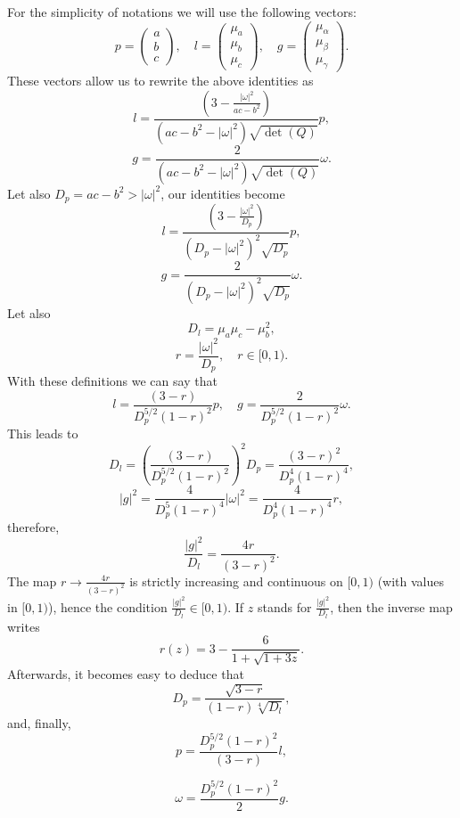 For the simplicity of notations we will use the following vectors:
\[
    p = \begin{pmatrix}
        a\\b\\c
    \end{pmatrix},
    \quad
    l = \begin{pmatrix}
        \mu_a\\\mu_b\\\mu_c
    \end{pmatrix},
    \quad 
    g = \begin{pmatrix}
        \mu_{\alpha}\\\mu_{\beta}\\\mu_{\gamma}
    \end{pmatrix}.
\]
These vectors allow us to rewrite the above identities as
\[
    l = \frac{  \left(3-\frac{|\omega|^2}{ac-b^2}\right)}
    {(ac-b^2-|\omega|^2)\sqrt {\det(Q)}}p,
\]
\[
    g =  \frac{2 }{(ac-b^2-|\omega|^2)\sqrt {\det(Q)}}\omega.
\]
Let also $D_p=ac-b^2>|\omega|^2$, our identities become
\[
    l = \frac{  \left(3-\frac{|\omega|^2}{D_p}\right)}{(D_p-|\omega|^2)^2\sqrt { D_p}}p,
\]
\[
    g =  \frac{2 }{(D_p-|\omega|^2)^2\sqrt { D_p}}\omega.
\]
Let also 
\[
    D_l = \mu_a \mu_c- \mu_b^2,
\]
\[
    r = \frac{|\omega|^2}{D_p},\quad  r\in[0,1) .
\]
With these definitions we can say that
\[
    l = \frac{ (3-r )}{D_p^{5/2}(1-r)^2}p,
    \quad g = \frac{2 }{D_p^{5/2}(1-r)^2}\omega.
\]
This leads to
\[
    D_l = \left( \frac{ (3-r )} {D_p^{5/2}(1-r)^2}\right)^2 D_p = 
       \frac{ (3-r )^2} {D_p^{4}(1-r)^4}, 
\]
\[
    |g|^2 = \frac{4 }{D_p^{5 }(1-r)^4}|\omega|^2 =
    \frac{4 }{D_p^{4 }(1-r)^4}r,
\]
therefore,
\[
    \frac{|g|^2}{D_l}=\frac{4r}{(3-r )^2}.
\]
The map $r\to\frac{4r}{(3-r )^2} $ is strictly increasing and continuous on $[0,1)$ (with values in $[0,1)$), hence the condition $ \frac{|g|^2}{D_l}\in[0,1)$. If $z$ stands for $\frac{|g|^2}{D_l}$, then the inverse map writes
\[
    r(z)=3 - \frac{6}{1+\sqrt{1+3z}}.
\]
Afterwards, it becomes easy to deduce that
\[
    D_p = \frac{\sqrt{3-r}}{(1-r)\sqrt[4]{D_l}},
\]
and, finally,
\[
    p = \frac{D_p^{5/2}(1-r)^2}{ (3-r )}l,
\]

\[
    \omega = \frac{D_p^{5/2}(1-r)^2}{2 }g.
\]